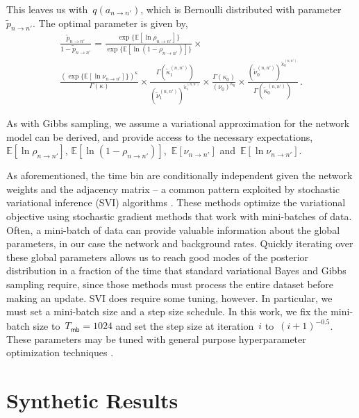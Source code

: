 This leaves us with~$q(a_{n \to n'})$, which is Bernoulli distributed
with parameter~$\widetilde{p}_{n \to n'}$. The optimal parameter is given by,
\begin{multline*}
  \frac{\widetilde{p}_{n \to n'}}{1-\widetilde{p}_{n \to n'}} =  
  \frac{\exp\{\mathbb{E} [\ln \rho_{n \to n'}] \} }{\exp\{\mathbb{E}[\ln (1-\rho_{n \to n'})] \}} \times \\
  \frac{ (\exp\{\mathbb{E} [\ln \nu_{n \to n'}] \})^{\kappa} }{ \Gamma(\kappa)} \times 
  \frac{\Gamma(\widetilde{\kappa}^{(n,n')}_1)}{ (\widetilde{\nu}^{(n,n')}_1)^{\widetilde{\kappa}^{(n,n')}_1} } \times
  \frac{\Gamma(\kappa_0)}{ (\nu_0)^{\kappa_0} } \times
  \frac{(\widetilde{\nu}^{(n,n')}_0)^{\widetilde{\kappa}^{(n,n')}_0}}{ \Gamma(\widetilde{\kappa}^{(n,n')}_0)}\,.
\end{multline*}

As with Gibbs sampling, we assume a variational approximation for the
network model can be derived, and provide access to the necessary
expectations,~$\mathbb{E}[\ln \rho_{n \to n'}]$,
$\mathbb{E}[\ln(1-\rho_{n \to n'})]$,~$\mathbb{E}[\nu_{n \to n'}]$ and~$\mathbb{E}[\ln \nu_{n \to n'}]$.

As aforementioned, the time bin are conditionally independent given
the network weights and the adjacency matrix -- a common pattern
exploited by stochastic variational inference (SVI) algorithms
\cite{Hoffman-2013}.  These methods optimize the variational objective
using stochastic gradient methods that work with mini-batches of data.
Often, a mini-batch of data can provide valuable information about the
global parameters, in our case the network and background rates.
Quickly iterating over these global parameters allows us to reach good
modes of the posterior distribution in a fraction of the time that
standard variational Bayes and Gibbs sampling require, since those
methods must process the entire dataset before making an update.  SVI
does require some tuning, however. In particular, we must set a
mini-batch size and a step size schedule.  In this work, we fix the
mini-batch size to~${T_{\mathsf{mb}}=1024}$ and set the step size at
iteration~$i$ to~${(i+1)^{-0.5}}$.  These parameters may be tuned with
general purpose hyperparameter optimization techniques
\cite{Snoek-2012}.

\section{Synthetic Results}

